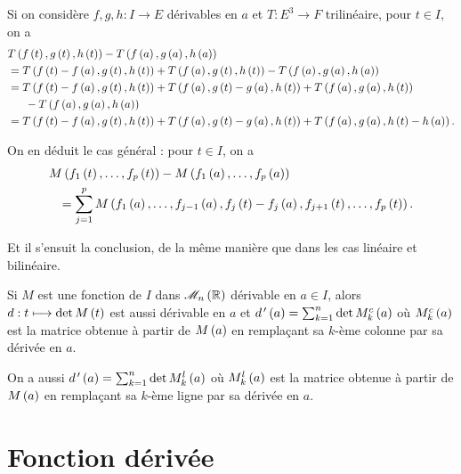 \begin{dem}
Si on considère \(f,g,h:I\to E\) dérivables en \(a\) et \(T:E^3\to F\) trilinéaire, pour \(t\in I\), on a \[\begin{aligned}
&T\left(f\left(t\right),g\left(t\right),h\left(t\right)\right)-T\left(f\left(a\right),g\left(a\right),h\left(a\right)\right) \\
&=T\left(f\left(t\right)-f\left(a\right),g\left(t\right),h\left(t\right)\right)+T\left(f\left(a\right),g\left(t\right),h\left(t\right)\right)-T\left(f\left(a\right),g\left(a\right),h\left(a\right)\right) \\
&=T\left(f\left(t\right)-f\left(a\right),g\left(t\right),h\left(t\right)\right)+T\left(f\left(a\right),g\left(t\right)-g\left(a\right),h\left(t\right)\right)+T\left(f\left(a\right),g\left(a\right),h\left(t\right)\right) \\
&\phantom{==}-T\left(f\left(a\right),g\left(a\right),h\left(a\right)\right) \\
&=T\left(f\left(t\right)-f\left(a\right),g\left(t\right),h\left(t\right)\right)+T\left(f\left(a\right),g\left(t\right)-g\left(a\right),h\left(t\right)\right)+T\left(f\left(a\right),g\left(a\right),h\left(t\right)-h\left(a\right)\right).
\end{aligned}\]

On en déduit le cas général : pour \(t\in I\), on a \[\begin{aligned}
&M\left(f_1\left(t\right),\dots,f_p\left(t\right)\right)-M\left(f_1\left(a\right),\dots,f_p\left(a\right)\right) \\
&\phantom{=}=\sum_{j=1}^pM\left(f_1\left(a\right),\dots,f_{j-1}\left(a\right),f_j\left(t\right)-f_j\left(a\right),f_{j+1}\left(t\right),\dots,f_p\left(t\right)\right).
\end{aligned}\]

Et il s'ensuit la conclusion, de la même manière que dans les cas linéaire et bilinéaire.
\end{dem}

\begin{ex}
Si \(M\) est une fonction de \(I\) dans \(\M{n}[\R]\) dérivable en \(a\in I\), alors \(d:t\longmapsto\det M\left(t\right)\) est aussi dérivable en \(a\) et \(d^{\,\prime}\left(a\right)=\sum_{k=1}^n\det M_k^c\left(a\right)\) où \(M_k^c\left(a\right)\) est la matrice obtenue à partir de \(M\left(a\right)\) en remplaçant sa \(k\)-ème colonne par sa dérivée en \(a\).

On a aussi \(d^{\,\prime}\left(a\right)=\sum_{k=1}^n\det M_k^l\left(a\right)\) où \(M_k^l\left(a\right)\) est la matrice obtenue à partir de \(M\left(a\right)\) en remplaçant sa \(k\)-ème ligne par sa dérivée en \(a\).
\end{ex}

\section{Fonction dérivée}

